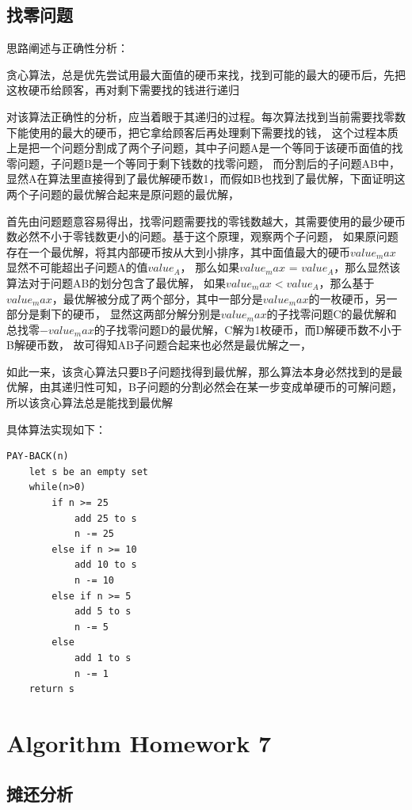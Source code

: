 \documentclass[cn,11pt,chinese]{elegantbook}
\begin{document}
\section{找零问题}

思路阐述与正确性分析：

贪心算法，总是优先尝试用最大面值的硬币来找，找到可能的最大的硬币后，先把这枚硬币给顾客，再对剩下需要找的钱进行递归

对该算法正确性的分析，应当着眼于其递归的过程。每次算法找到当前需要找零数下能使用的最大的硬币，把它拿给顾客后再处理剩下需要找的钱，
这个过程本质上是把一个问题分割成了两个子问题，其中子问题A是一个等同于该硬币面值的找零问题，子问题B是一个等同于剩下钱数的找零问题，
而分割后的子问题AB中，显然A在算法里直接得到了最优解硬币数1，而假如B也找到了最优解，下面证明这两个子问题的最优解合起来是原问题的最优解，

首先由问题题意容易得出，找零问题需要找的零钱数越大，其需要使用的最少硬币数必然不小于零钱数更小的问题。基于这个原理，观察两个子问题，
如果原问题存在一个最优解，将其内部硬币按从大到小排序，其中面值最大的硬币$value_max$显然不可能超出子问题A的值$value_A$，
那么如果$value_max$ = $value_A$，那么显然该算法对于问题AB的划分包含了最优解，
如果$value_max < value_A$，那么基于$value_max$，最优解被分成了两个部分，其中一部分是$value_max$的一枚硬币，另一部分是剩下的硬币，
显然这两部分解分别是$value_max$的子找零问题C的最优解和总找零$-value_max$的子找零问题D的最优解，C解为1枚硬币，而D解硬币数不小于B解硬币数，
故可得知AB子问题合起来也必然是最优解之一，

如此一来，该贪心算法只要B子问题找得到最优解，那么算法本身必然找到的是最优解，由其递归性可知，B子问题的分割必然会在某一步变成单硬币的可解问题，
所以该贪心算法总是能找到最优解

具体算法实现如下：
\begin{lstlisting}
PAY-BACK(n)
	let s be an empty set
	while(n>0)	
		if n >= 25
			add 25 to s
			n -= 25
		else if n >= 10
			add 10 to s
			n -= 10
		else if n >= 5
			add 5 to s
			n -= 5
		else
			add 1 to s
			n -= 1
	return s
\end{lstlisting}

\chapter{Algorithm Homework 7}

\section{摊还分析}
\end{document}

